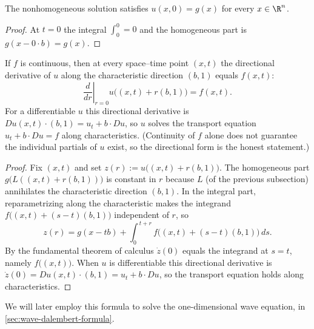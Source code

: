 \begin{theorem}
\label{thm:transport-nonhom-initial-condition}
\leanok
The nonhomogeneous solution satisfies $u(x,0) = g(x)$ for every $x \in \R^n$.
\end{theorem}
\begin{proof}
\leanok
At $t = 0$ the integral $\int_0^0 = 0$ and the homogeneous part is $g(x - 0
\cdot b) = g(x)$.
\end{proof}

\begin{theorem}
\label{thm:transport-nonhom-solves}
\leanok
If $f$ is continuous, then at every space--time point $(x,t)$ the directional
derivative of $u$ along the characteristic direction $(b,1)$ equals $f(x,t)$:
$$\left.\frac{d}{dr}\right|_{r=0} u\bigl((x,t) + r(b,1)\bigr) = f(x,t).$$
For a differentiable $u$ this directional derivative is $Du(x,t) \cdot (b,1) =
u_t + b \cdot Du$, so $u$ solves the transport equation $u_t + b \cdot Du = f$
along characteristics. (Continuity of $f$ alone does not guarantee the individual
partials of $u$ exist, so the directional form is the honest statement.)
\end{theorem}
\begin{proof}
\leanok
Fix $(x,t)$ and set $z(r) := u\bigl((x,t) + r(b,1)\bigr)$. The homogeneous part
$g\bigl(L((x,t) + r(b,1))\bigr)$ is constant in $r$ because $L$ (of the previous
subsection) annihilates the characteristic direction $(b,1)$. In the integral
part, reparametrizing along the characteristic makes the integrand
$f\bigl((x,t) + (s - t)(b,1)\bigr)$ independent of $r$, so
$$z(r) = g(x - tb) + \int_0^{\,t + r} f\bigl((x,t) + (s - t)(b,1)\bigr)\,ds.$$
By the fundamental theorem of calculus $\dot z(0)$ equals the integrand at
$s = t$, namely $f\bigl((x,t)\bigr)$. When $u$ is differentiable this directional
derivative is $\dot z(0) = Du(x,t) \cdot (b,1) = u_t + b \cdot Du$, so the
transport equation holds along characteristics.
\end{proof}

We will later employ this formula to solve the one-dimensional wave equation, in \cref{sec:wave-dalembert-formula}.

